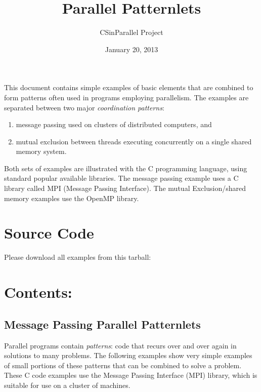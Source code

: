 \documentclass[letterpaper,10pt,openany,oneside]{sphinxmanual}
\title{Parallel Patternlets}
\date{January 20, 2013}
\author{CSinParallel Project}
\begin{document}
\maketitle
\tableofcontents
{}\label{index::doc}


This document contains simple examples of basic elements that are combined to form
patterns often used in
programs employing parallelism.  The examples are separated between
two major \emph{coordination patterns}:
\begin{enumerate}
\item {} 
message passing used on clusters of distributed computers, and

\item {} 
mutual exclusion between threads executing concurrently on a single shared memory system.

\end{enumerate}

Both sets of examples are illustrated
with the C programming language, using standard popular available libraries.
The message passing example uses
a C library called MPI (Message Passing Interface).  The mutual Exclusion/shared memory
examples use the OpenMP library.


\chapter{Source Code}
\label{index:source-code}\label{index:parallel-patternlets}
Please download all examples from this tarball:


\chapter{Contents:}
\label{index:contents}

\section{Message Passing Parallel Patternlets}
\label{MessagePassing/MPI_Patternlets:message-passing-parallel-patternlets}\label{MessagePassing/MPI_Patternlets::doc}
Parallel programs contain \emph{patterns}:  code that recurs over and over again
in solutions to many problems.  The following examples show very simple
examples of small portions of
these patterns that can be combined to solve a problem.  These C code examples use the
Message Passing Interface (MPI) library, which is suitable for use on a cluster
of machines.
\end{document}
